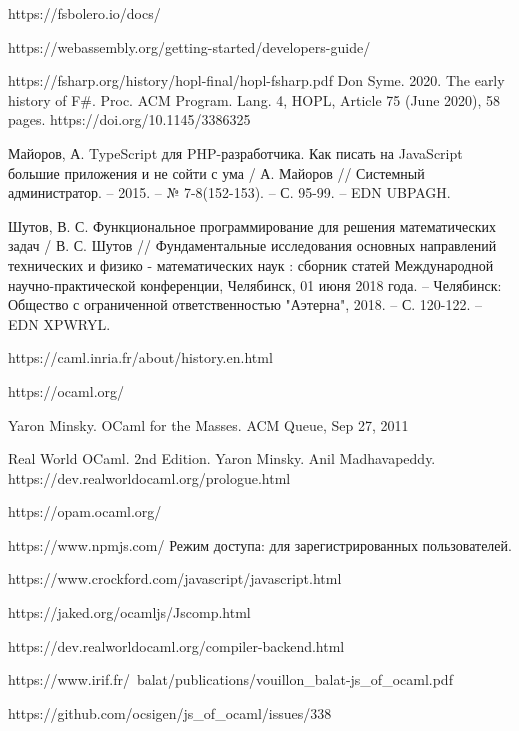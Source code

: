 \begin{thebibliography}{00}
    https://fsbolero.io/docs/ \TODO

    https://webassembly.org/getting-started/developers-guide/ \TODO

    https://fsharp.org/history/hopl-final/hopl-fsharp.pdf
    Don Syme. 2020. The early history of F\#. Proc. ACM Program. Lang. 4, HOPL, Article 75 (June 2020), 58 pages. https://doi.org/10.1145/3386325
    \TODO

    Майоров, А. TypeScript для PHP-разработчика. Как писать на JavaScript большие приложения и не сойти с ума /
    А. Майоров // Системный администратор. – 2015. – № 7-8(152-153). – С. 95-99. – EDN UBPAGH.

    Шутов, В. С. Функциональное программирование для решения математических задач
    / В. С. Шутов // Фундаментальные исследования основных направлений технических и физико - математических наук
    : сборник статей Международной научно-практической конференции, Челябинск, 01 июня 2018 года.
    – Челябинск: Общество с ограниченной ответственностью "Аэтерна", 2018. – С. 120-122. – EDN XPWRYL.

    https://caml.inria.fr/about/history.en.html \TODO

    https://ocaml.org/ \TODO

    Yaron Minsky. OCaml for the Masses. ACM Queue, Sep 27, 2011 \TODO

    Real World OCaml. 2nd Edition. Yaron Minsky. Anil Madhavapeddy.
    https://dev.realworldocaml.org/prologue.html \TODO

    https://opam.ocaml.org/ \TODO

    https://www.npmjs.com/ \TODO Режим доступа: для зарегистрированных пользователей.

    https://www.crockford.com/javascript/javascript.html

    https://jaked.org/ocamljs/Jscomp.html \TODO

    https://dev.realworldocaml.org/compiler-backend.html \TODO

    https://www.irif.fr/~balat/publications/vouillon\_balat-js\_of\_ocaml.pdf \TODO

    https://github.com/ocsigen/js\_of\_ocaml/issues/338 \TODO


\end{thebibliography}
